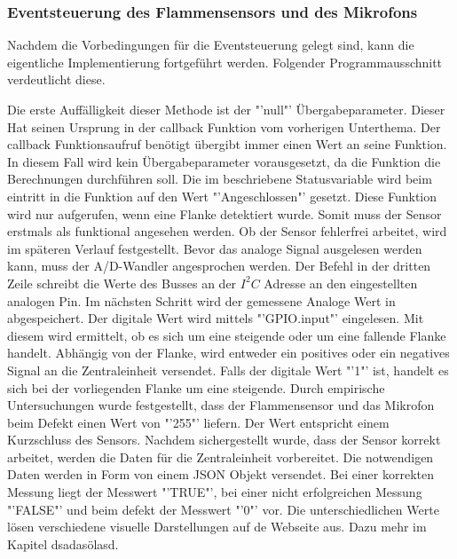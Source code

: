 \subsubsection*{Eventsteuerung des Flammensensors und des Mikrofons}
	Nachdem die Vorbedingungen für die Eventsteuerung gelegt sind, kann die eigentliche Implementierung fortgeführt werden. Folgender Programmausschnitt verdeutlicht diese.
	
	Die erste Auffälligkeit dieser Methode ist der "'null"' Übergabeparameter. Dieser Hat seinen Ursprung in der callback Funktion vom vorherigen Unterthema. Der callback Funktionsaufruf benötigt übergibt immer einen Wert an seine Funktion. In diesem Fall wird kein Übergabeparameter vorausgesetzt, da die Funktion die Berechnungen durchführen soll. Die im  beschriebene Statusvariable wird beim eintritt in die Funktion auf den Wert "'Angeschlossen"' gesetzt. Diese Funktion wird nur aufgerufen, wenn eine Flanke detektiert wurde. Somit muss der Sensor erstmals als funktional angesehen werden. Ob der Sensor fehlerfrei arbeitet, wird im späteren Verlauf festgestellt. Bevor das analoge Signal ausgelesen werden kann, muss der \ac{A/D-Wandler} angesprochen werden. Der Befehl in der dritten Zeile schreibt die Werte des Busses an der $I^2C$ Adresse an den eingestellten analogen Pin. Im nächsten Schritt wird der gemessene Analoge Wert in abgespeichert. Der digitale Wert wird mittels "'GPIO.input"' eingelesen. Mit diesem wird ermittelt, ob es sich um eine steigende oder um eine fallende Flanke handelt. Abhängig von der Flanke, wird entweder ein positives oder ein negatives Signal an die Zentraleinheit versendet. Falls der digitale Wert "'1"' ist, handelt es sich bei der vorliegenden Flanke um eine steigende. Durch empirische Untersuchungen wurde festgestellt, dass der Flammensensor und das Mikrofon beim Defekt einen Wert von "'255"' liefern. Der Wert entspricht einem Kurzschluss des Sensors. Nachdem sichergestellt wurde, dass der Sensor korrekt arbeitet, werden die Daten für die Zentraleinheit vorbereitet. Die notwendigen Daten werden in Form von einem \ac{JSON} Objekt versendet. Bei einer korrekten Messung liegt der Messwert "'TRUE"', bei einer nicht erfolgreichen Messung "'FALSE"' und beim defekt der Messwert "'0"' vor. Die unterschiedlichen Werte lösen verschiedene visuelle Darstellungen auf de Webseite aus. Dazu mehr im Kapitel
	dsadasölasd.

